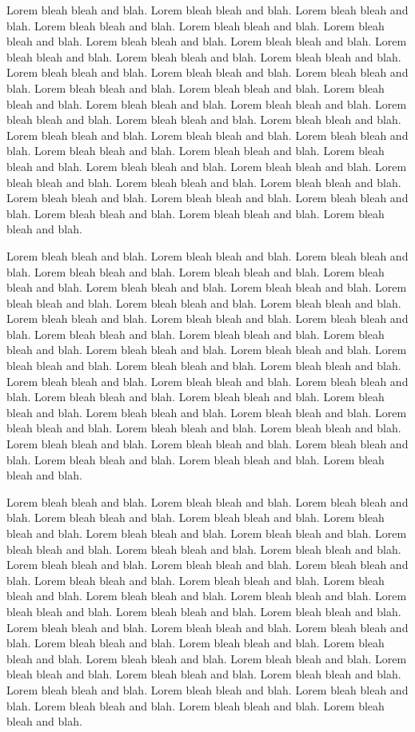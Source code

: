\documentclass[letterpaper,10pt]{article}
\begin{document}
Lorem bleah bleah and blah. Lorem bleah bleah and blah. Lorem bleah
bleah and blah. Lorem bleah bleah and blah. Lorem bleah bleah and
blah. Lorem bleah bleah and blah. Lorem bleah bleah and blah. Lorem
bleah bleah and blah. Lorem bleah bleah and blah. Lorem bleah bleah
and blah. Lorem bleah bleah and blah. Lorem bleah bleah and blah.
Lorem bleah bleah and blah. Lorem bleah bleah and blah. Lorem bleah
bleah and blah. Lorem bleah bleah and blah. Lorem bleah bleah and
blah. Lorem bleah bleah and blah. Lorem bleah bleah and blah. Lorem
bleah bleah and blah. Lorem bleah bleah and blah. Lorem bleah bleah
and blah. Lorem bleah bleah and blah. Lorem bleah bleah and blah.
Lorem bleah bleah and blah. Lorem bleah bleah and blah. Lorem bleah
bleah and blah. Lorem bleah bleah and blah. Lorem bleah bleah and
blah. Lorem bleah bleah and blah. Lorem bleah bleah and blah. Lorem
bleah bleah and blah. Lorem bleah bleah and blah. Lorem bleah bleah
and blah. Lorem bleah bleah and blah. Lorem bleah bleah and blah.
Lorem bleah bleah and blah. Lorem bleah bleah and blah. Lorem bleah
bleah and blah.

Lorem bleah bleah and blah. Lorem bleah bleah and blah. Lorem bleah
bleah and blah. Lorem bleah bleah and blah. Lorem bleah bleah and
blah. Lorem bleah bleah and blah. Lorem bleah bleah and blah. Lorem
bleah bleah and blah. Lorem bleah bleah and blah. Lorem bleah bleah
and blah. Lorem bleah bleah and blah. Lorem bleah bleah and blah.
Lorem bleah bleah and blah. Lorem bleah bleah and blah. Lorem bleah
bleah and blah. Lorem bleah bleah and blah. Lorem bleah bleah and
blah. Lorem bleah bleah and blah. Lorem bleah bleah and blah. Lorem
bleah bleah and blah. Lorem bleah bleah and blah. Lorem bleah bleah
and blah. Lorem bleah bleah and blah. Lorem bleah bleah and blah.
Lorem bleah bleah and blah. Lorem bleah bleah and blah. Lorem bleah
bleah and blah. Lorem bleah bleah and blah. Lorem bleah bleah and
blah. Lorem bleah bleah and blah. Lorem bleah bleah and blah. Lorem
bleah bleah and blah. Lorem bleah bleah and blah. Lorem bleah bleah
and blah. Lorem bleah bleah and blah. Lorem bleah bleah and blah.
Lorem bleah bleah and blah. Lorem bleah bleah and blah. Lorem bleah
bleah and blah.

Lorem bleah bleah and blah. Lorem bleah bleah and blah. Lorem bleah
bleah and blah. Lorem bleah bleah and blah. Lorem bleah bleah and
blah. Lorem bleah bleah and blah. Lorem bleah bleah and blah. Lorem
bleah bleah and blah. Lorem bleah bleah and blah. Lorem bleah bleah
and blah. Lorem bleah bleah and blah. Lorem bleah bleah and blah.
Lorem bleah bleah and blah. Lorem bleah bleah and blah. Lorem bleah
bleah and blah. Lorem bleah bleah and blah. Lorem bleah bleah and
blah. Lorem bleah bleah and blah. Lorem bleah bleah and blah. Lorem
bleah bleah and blah. Lorem bleah bleah and blah. Lorem bleah bleah
and blah. Lorem bleah bleah and blah. Lorem bleah bleah and blah.
Lorem bleah bleah and blah. Lorem bleah bleah and blah. Lorem bleah
bleah and blah. Lorem bleah bleah and blah. Lorem bleah bleah and
blah. Lorem bleah bleah and blah. Lorem bleah bleah and blah. Lorem
bleah bleah and blah. Lorem bleah bleah and blah. Lorem bleah bleah
and blah. Lorem bleah bleah and blah. Lorem bleah bleah and blah.
Lorem bleah bleah and blah. Lorem bleah bleah and blah. Lorem bleah
bleah and blah.


\singlespacing

\end{document}
